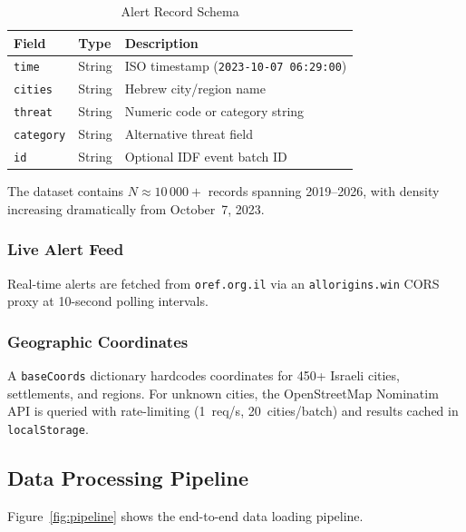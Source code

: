 \documentclass[12pt,a4paper]{article}
\begin{document}
\begin{table}[H]\centering
\caption{Alert Record Schema}
\label{tab:schema}
\begin{tabular}{lll}\toprule
\textbf{Field} & \textbf{Type} & \textbf{Description} \\\midrule
\texttt{time}     & String & ISO timestamp (\texttt{2023-10-07 06:29:00}) \\
\texttt{cities}   & String & Hebrew city/region name \\
\texttt{threat}   & String & Numeric code or category string \\
\texttt{category} & String & Alternative threat field \\
\texttt{id}       & String & Optional IDF event batch ID \\\bottomrule
\end{tabular}
\end{table}

\noindent The dataset contains $N\!\approx\!10\,000{+}$ records spanning
2019--2026, with density increasing dramatically from October~7, 2023.

\subsubsection{Live Alert Feed}
Real-time alerts are fetched from \texttt{oref.org.il} via an
\texttt{allorigins.win} CORS proxy at 10-second polling intervals.

\subsubsection{Geographic Coordinates}
A \texttt{baseCoords} dictionary hardcodes coordinates for 450+ Israeli cities,
settlements, and regions. For unknown cities, the OpenStreetMap Nominatim API is
queried with rate-limiting (1~req/s, 20~cities/batch) and results cached in
\texttt{localStorage}.

\subsection{Data Processing Pipeline}

Figure~\ref{fig:pipeline} shows the end-to-end data loading pipeline.
\end{document}
